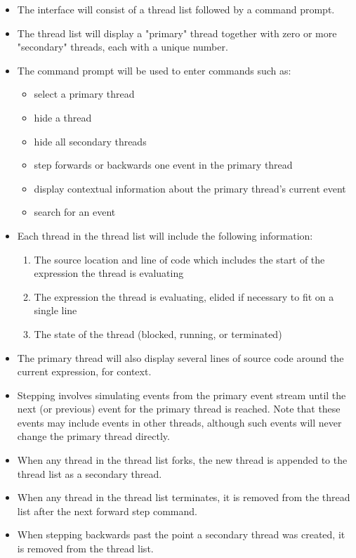 \documentclass{article}[12pt]
\begin{document}
\begin{itemize}
\item The interface will consist of a thread list followed by a command prompt.
\item The thread list will display a "primary" thread together with zero or
more "secondary" threads, each with a unique number.
\item The command prompt will be used to enter commands such as:
	\begin{itemize}
	\item select a primary thread
	\item hide a thread
	\item hide all secondary threads
	\item step forwards or backwards one event in the primary thread
	\item display contextual information about the primary thread's current event
	\item search for an event
	\end{itemize}
\item Each thread in the thread list will include the following information:
	\begin{enumerate}
	\item The source location and line of code which includes the start of the expression the thread is evaluating
	\item The expression the thread is evaluating, elided if necessary to fit on a single line
	\item The state of the thread (blocked, running, or terminated)
	\end{enumerate}
\item The primary thread will also display several lines of source code around the current expression, for context.
\item Stepping involves simulating events from the primary event stream until
the next (or previous) event for the primary thread is reached. Note that these
events may include events in other threads, although such events will never
change the primary thread directly.
\item When any thread in the thread list forks, the new thread is appended to the thread list as a secondary thread.
\item When any thread in the thread list terminates, it is removed from the
thread list after the next forward step command.
\item When stepping backwards past the point a secondary thread was created, it is removed from the thread list.

\end{itemize}
\end{document}

